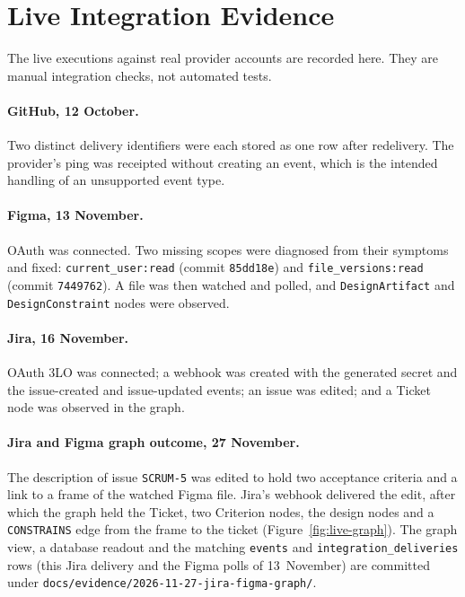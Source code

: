 \section{Live Integration Evidence}
\label{sec:live-integration}

The live executions against real provider accounts are recorded here. They
are manual integration checks, not automated tests.

\paragraph{GitHub, 12 October.} Two distinct delivery identifiers were each
stored as one row after redelivery. The provider's ping was receipted without
creating an event, which is the intended handling of an unsupported event type.

\paragraph{Figma, 13 November.} OAuth was connected. Two missing scopes were
diagnosed from their symptoms and fixed: \texttt{current\_user:read} (commit
\texttt{85dd18e}) and \texttt{file\_versions:read} (commit \texttt{7449762}). A
file was then watched and polled, and \texttt{DesignArtifact} and
\texttt{DesignConstraint} nodes were observed.

\paragraph{Jira, 16 November.} OAuth 3LO was connected; a webhook was created
with the generated secret and the issue-created and issue-updated events; an
issue was edited; and a Ticket node was observed in the graph.

\paragraph{Jira and Figma graph outcome, 27 November.} The description of issue
\texttt{SCRUM-5} was edited to hold two acceptance criteria and a link to a
frame of the watched Figma file. Jira's webhook delivered the edit, after which
the graph held the Ticket, two Criterion nodes, the design nodes and a
\texttt{CONSTRAINS} edge from the frame to the ticket
(Figure~\ref{fig:live-graph}). The graph view, a database readout and the
matching \texttt{events} and \texttt{integration\_deliveries} rows (this Jira
delivery and the Figma polls of 13~November) are committed under
\texttt{docs/\allowbreak{}evidence/\allowbreak{}2026-11-27-jira-figma-graph/}.

